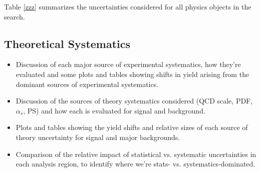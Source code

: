Table \ref{zzz} summarizes the uncertainties considered for all physics objects in the search. 



\subsection{Theoretical Systematics}


\begin{itemize}
\item Discussion of each major source of experimental systematics, how they're evaluated and some plots and tables showing shifts in yield arising from the dominant sources of experimental systematics.
\item Discussion of the sources of theory systematics considered (QCD scale, PDF, $\alpha_s$, PS) and how each is evaluated for signal and background.
\item Plots and tables showing the yield shifts and relative sizes of each source of theory uncertainty for signal and major backgrounds.
\item Comparison of the relative impact of statistical vs. systematic uncertainties in each analysis region, to identify where we're stats- vs. systematics-dominated.
\end{itemize}